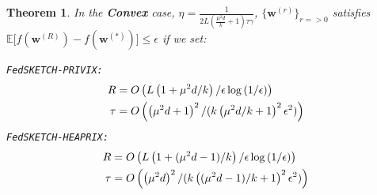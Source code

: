 \documentclass[twoside]{article}
\newtheorem{theorem}{Theorem}
\begin{document}
\begin{theorem}
In the \textbf{Convex} case, $\eta=\frac{1}{2L\left(\frac{\mu^2d}{k}+1\right)\tau\gamma}$, $\{ {\boldsymbol{w}}^{(r)}\}_{r=>0}$ satisfies $ \mathbb{E}\Big[f({\boldsymbol{w}}^{(R)})-f({\boldsymbol{w}}^{(*)})\Big]\leq \epsilon$ if we set:  

\noindent \texttt{FedSKETCH-PRIVIX:}  
\begin{equation}\notag
\begin{split}
R& =O\left(L\left(1+\mu^2d/k\right)/\epsilon\log\left(1/\epsilon \right)\right)\\
 \tau&=O\left(\left(\mu^2d+1\right)^2/(k\left(\mu^2d/k+1\right)^2\epsilon^2)\right)
  \end{split}
 \end{equation}
\noindent \texttt{FedSKETCH-HEAPRIX:} 
\begin{equation}\notag
\begin{split}
R& =O\left(L\left(1+(\mu^2d-1)/k\right)/\epsilon\log\left(1/\epsilon \right)\right)\\
 \tau&=O\left(\left(\mu^2d\right)^2/(k\left((\mu^2d-1)/k+1\right)^2\epsilon^2)\right)
  \end{split}
 \end{equation}
\end{theorem}
\end{document}
